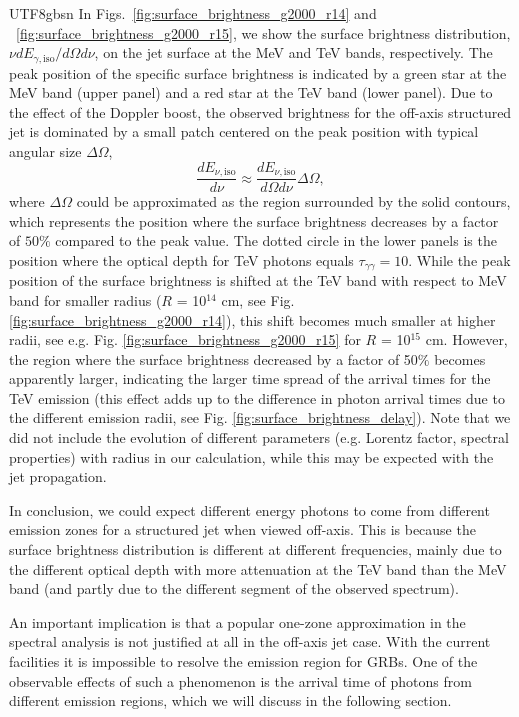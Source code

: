 \documentclass[fleqn,usenatbib]{mnras}
\begin{document}
\begin{CJK*}{UTF8}{gbsn}
In Figs.~\ref{fig:surface_brightness_g2000_r14} and ~\ref{fig:surface_brightness_g2000_r15}, we show the surface brightness distribution, $\nu dE_{\gamma,\mathrm{iso}}/d\Omega d\nu$, on the jet surface at the MeV and TeV bands, respectively.
The peak position of the specific surface brightness is indicated by a green star at the MeV band (upper panel) and a red star at the TeV band (lower panel).
Due to the effect of the Doppler boost, the observed brightness for the off-axis structured jet is dominated by a small patch centered on the peak position with typical angular size $\Delta \Omega$, 
\begin{equation}
    \frac{dE_{\nu,\mathrm{iso}}}{d\nu} \approx \frac{dE_{\nu,\mathrm{iso}}}{d\Omega d\nu} \Delta \Omega,
\end{equation}
where $\Delta \Omega$ could be approximated as the region surrounded by the solid contours, 
which represents the position where the surface brightness decreases by a factor of $50\%$ compared to the peak value. The dotted circle in the lower panels is the position where the optical depth for TeV photons equals $\tau_{\gamma \gamma} = 10$. While the peak position of the surface brightness is shifted at the TeV band with respect to MeV band for smaller radius ($R$ = 10$^{14}$ cm, see Fig. \ref{fig:surface_brightness_g2000_r14}), this shift becomes much smaller at higher radii, see e.g. Fig. \ref{fig:surface_brightness_g2000_r15} for $R $ = 10$^{15}$ cm. However, the region where the surface brightness decreased by a factor of 50$\%$  becomes apparently larger, indicating the larger time spread of the arrival times for the TeV emission (this effect adds up to the difference in photon arrival times due to the different emission radii, see Fig. \ref{fig:surface_brightness_delay}).  Note that we did not include the evolution of different parameters (e.g. Lorentz factor, spectral properties) with radius in our calculation, while this may be expected with the jet propagation.

In conclusion, we could expect different energy photons to come from different emission zones for a structured jet when viewed off-axis. This is because the surface brightness distribution is different at different frequencies, mainly due to the different optical depth with more attenuation at the TeV band than the MeV band (and partly due to the different segment of the observed spectrum).

An important implication is that a popular one-zone approximation in the spectral analysis is not justified at all in the off-axis jet case.  
With the current facilities it is impossible to resolve the emission region for GRBs. One of the observable effects of such a phenomenon is the arrival time of photons from different emission regions, which we will discuss in the following section. 




\end{CJK*}
\end{document}
